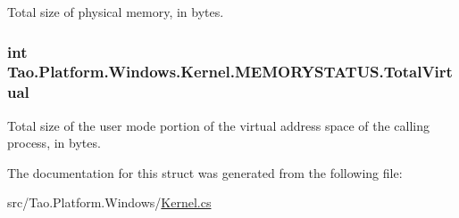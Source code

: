 Total size of physical memory, in bytes. 

\hypertarget{struct_tao_1_1_platform_1_1_windows_1_1_kernel_1_1_m_e_m_o_r_y_s_t_a_t_u_s_a61f8f15ebc315ebf005bf2ef644d379d}{
\subsubsection[{TotalVirtual}]{\setlength{\rightskip}{0pt plus 5cm}int {\bf Tao.Platform.Windows.Kernel.MEMORYSTATUS.TotalVirtual}}}
\label{struct_tao_1_1_platform_1_1_windows_1_1_kernel_1_1_m_e_m_o_r_y_s_t_a_t_u_s_a61f8f15ebc315ebf005bf2ef644d379d}


Total size of the user mode portion of the virtual address space of the calling process, in bytes. 



The documentation for this struct was generated from the following file:\begin{DoxyCompactItemize}
\item 
src/Tao.Platform.Windows/\hyperlink{_kernel_8cs}{Kernel.cs}\end{DoxyCompactItemize}
